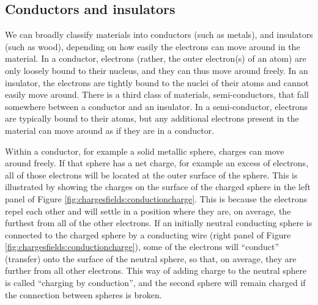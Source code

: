 \subsection{Conductors and insulators}
We can broadly classify materials into conductors (such as metals), and insulators (such as wood), depending on how easily the electrons can move around in the material. In a conductor, electrons (rather, the outer electron(s) of an atom) are only loosely bound to their nucleus, and they can thus move around freely. In an insulator, the electrons are tightly bound to the nuclei of their atoms and cannot easily move around. There is a third class of materials, semi-conductors, that fall somewhere between a conductor and an insulator. In a semi-conductor, electrons are typically bound to their atoms, but any additional electrons present in the material can move around as if they are in a conductor. 

Within a conductor, for example a solid metallic sphere, charges can move around freely. If that sphere has a net charge, for example an excess of electrons, all of those electrons will be located at the outer surface of the sphere. This is illustrated by showing the charges on the surface of the charged sphere in the left panel of Figure \ref{fig:chargesfields:conductioncharge}. This is because the electrons repel each other and will settle in a position where they are, on average, the furthest from all of the other electrons. If an initially neutral conducting sphere is connected to the charged sphere by a conducting wire (right panel of Figure \ref{fig:chargesfields:conductioncharge}), some of the electrons will ``conduct'' (transfer) onto the surface of the neutral sphere, so that, on average, they are further from all other electrons. This way of adding charge to the neutral sphere is called ``charging by conduction'', and the second sphere will remain charged if the connection between spheres is broken.


